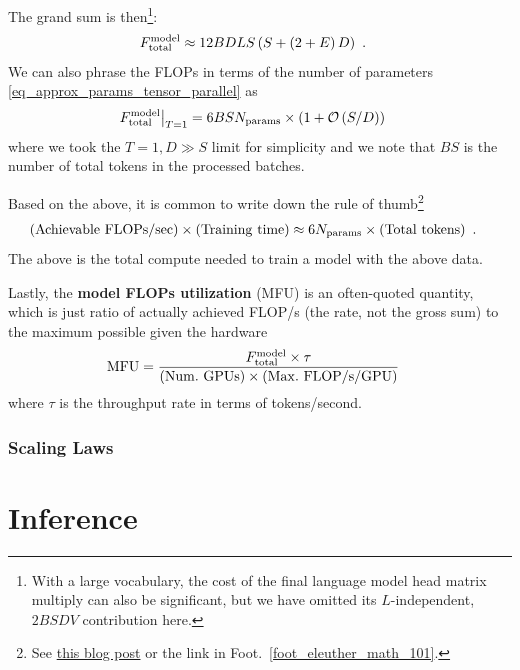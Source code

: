 \documentclass[11pt]{article}
\begin{document}
The grand sum is then\footnote{With a large vocabulary, the cost of the final language model head
matrix multiply can also be significant, but we have omitted its $ L $-independent,  $ 2BSDV $
contribution here. }:
\begin{align}
F _{ {\rm total}  } ^{ {\rm  model}  } &\approx 12 BDLS \left ( S + \left ( 2+E \right )D \right ) \label{eq_model_flops}\ .
\end{align}
We can also phrase the FLOPs in terms of the number of parameters \eqref{eq_approx_params_tensor_parallel} as
\begin{align}
 F _{ {\rm total}  } ^{ {\rm  model}  } \big| _{ T=1 }  &= 6BS N _{ {\rm  params}  }\times \left ( 1 + \mathcal{O} \left( S/D\right)  \right )
\end{align}
where we took the $ T=1, D \gg S $ limit for simplicity and we note that $ BS $  is the number of
total tokens in the processed batches.

Based on the above, it is common to write down the rule of
thumb\footnote{See
\href{https://medium.com/@dzmitrybahdanau/the-flops-calculus-of-language-model-training-3b19c1f025e4}{this
blog post} or the link in Foot.~\ref{foot_eleuther_math_101}.}
\begin{align}
  \left ( {\rm Achievable \ FLOPs/sec}  \right ) \times \left ( {\rm  Training \ time}  \right )
  &\approx 6 N _{ {\rm params}  } \times \left ( {\rm Total \ tokens} \right ) \ . \label{eq_training_rule_of_thumb}
\end{align}
The above is the total compute needed to train a model with the above data.


Lastly, the \textbf{model FLOPs utilization} (MFU) is an often-quoted quantity, which is just ratio
of actually achieved FLOP/s (the rate, not the gross sum) to the maximum possible given the hardware
\begin{align}
  {\rm MFU}  &= \frac{ F _{ {\rm total}  } ^{ {\rm  model}  } \times \tau }{ \left ( {\rm Num. \ GPUs}  \right ) \times \left ( {\rm Max. \ FLOP/s/GPU}  \right ) }
\end{align}
where $ \tau $ is the throughput rate in terms of tokens/second.

\section{Scaling Laws}

\part{Inference}
\end{document}

